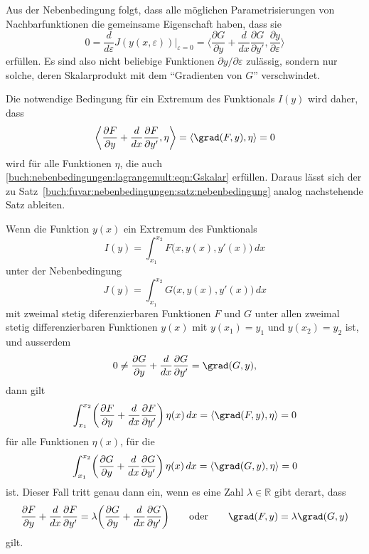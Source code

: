 Aus der Nebenbedingung folgt, dass alle möglichen Parametrisierungen
von Nachbarfunktionen die gemeinsame Eigenschaft haben, dass sie
\begin{equation}
0
=
\frac{d}{d\varepsilon}J(y(x,\varepsilon))\bigg|_{\varepsilon=0}
=
\biggl\langle
\frac{\partial G}{\partial y}+\frac{d}{dx}\frac{\partial G}{\partial y'}
,
\frac{\partial y}{\partial \varepsilon}
\biggr\rangle
\label{buch:nebenbedingungen:lagrangemult:eqn:Gskalar}
\end{equation}
erfüllen.
Es sind also nicht beliebige Funktionen $\partial y/\partial \varepsilon$
zulässig, sondern nur solche, deren Skalarprodukt mit dem
``Gradienten von $G$'' verschwindet.

Die notwendige Bedingung für ein Extremum des Funktionals $I(y)$ wird 
daher, dass
\[
\biggl\langle
\frac{\partial F}{\partial y} + \frac{d}{dx}\frac{\partial F}{\partial y'},
\eta
\biggr\rangle
=
\langle
\grad(F,y),
\eta
\rangle
=
0
\]
wird für alle Funktionen $\eta$, die auch
\eqref{buch:nebenbedingungen:lagrangemult:eqn:Gskalar}
erfüllen.
Daraus lässt sich der zu
Satz~\ref{buch:fuvar:nebenbedingungen:satz:nebenbedingung}
analog nachstehende Satz ableiten.

\begin{satz}
\label{buch:nebenbedingungen:lagrangemult:satz:einenb}
Wenn die Funktion $y(x)$ ein Extremum des Funktionals
\[
I(y) = \int_{x_1}^{x_2} F\bigl(x,y(x),y'(x)\bigr)\,dx
\]
unter der Nebenbedingung
\[
J(y) = \int_{x_1}^{x_2} G\bigl(x,y(x),y'(x)\bigr)\,dx
\]
mit zweimal stetig diferenzierbaren Funktionen $F$ und $G$
unter allen zweimal stetig differenzierbaren Funktionen $y(x)$
mit $y(x_1)=y_1$ und $y(x_2)=y_2$ ist,
und ausserdem
\[
0
\ne
\frac{\partial G}{\partial y}+\frac{d}{dx}\frac{\partial G}{\partial y'}
=
\grad (G,y),
\]
dann gilt
\[
\int_{x_1}^{x_2}
\biggl(
\frac{\partial F}{\partial y}
+
\frac{d}{dx}\frac{\partial F}{\partial y'}
\biggr)\,
\eta(x)\,dx
=
\langle
\grad (F,y),\eta
\rangle
=0
\]
für alle Funktionen $\eta(x)$, für die
\[
\int_{x_1}^{x_2}
\biggl(
\frac{\partial G}{\partial y}
+
\frac{d}{dx}\frac{\partial G}{\partial y'}
\biggr)\,
\eta(x)\,dx
=
\langle
\grad (G,y),\eta
\rangle
=0
\]
ist.
Dieser Fall tritt genau dann ein, wenn es eine Zahl $\lambda\in\mathbb{R}$
gibt derart, dass
\begin{equation}
\frac{\partial F}{\partial y}
+
\frac{d}{dx}\frac{\partial F}{\partial y'}
=
\lambda
\biggl(
\frac{\partial G}{\partial y}
+
\frac{d}{dx}\frac{\partial G}{\partial y'}
\biggr)
\qquad\text{oder}\qquad
\grad (F,y) = \lambda \grad(G,y)
\label{buch:nebenbedingungen:lagrangemult:notwendig}
\end{equation}
gilt.
\end{satz}

